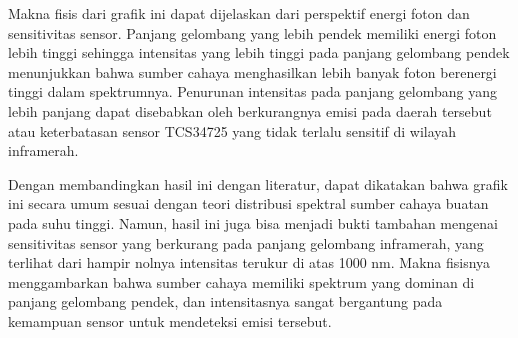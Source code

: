 Makna fisis dari grafik ini dapat dijelaskan dari perspektif energi foton dan sensitivitas sensor. Panjang gelombang yang lebih pendek memiliki energi foton lebih tinggi sehingga intensitas yang lebih tinggi pada panjang gelombang pendek menunjukkan bahwa sumber cahaya menghasilkan lebih banyak foton berenergi tinggi dalam spektrumnya. Penurunan intensitas pada panjang gelombang yang lebih panjang dapat disebabkan oleh berkurangnya emisi pada daerah tersebut atau keterbatasan sensor TCS34725 yang tidak terlalu sensitif di wilayah inframerah.

Dengan membandingkan hasil ini dengan literatur, dapat dikatakan bahwa grafik ini secara umum sesuai dengan teori distribusi spektral sumber cahaya buatan pada suhu tinggi. Namun, hasil ini juga bisa menjadi bukti tambahan mengenai sensitivitas sensor yang berkurang pada panjang gelombang inframerah, yang terlihat dari hampir nolnya intensitas terukur di atas 1000 nm. Makna fisisnya menggambarkan bahwa sumber cahaya memiliki spektrum yang dominan di panjang gelombang pendek, dan intensitasnya sangat bergantung pada kemampuan sensor untuk mendeteksi emisi tersebut.